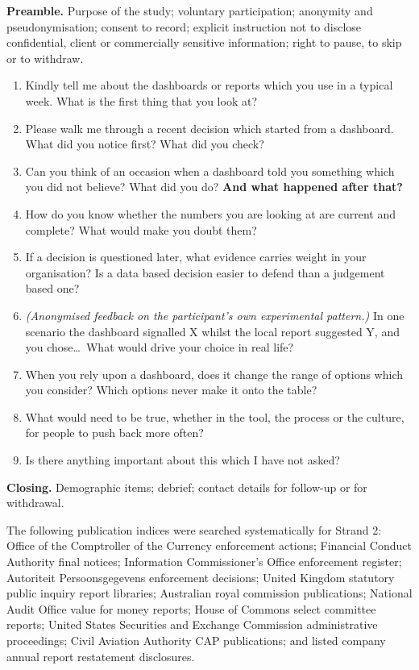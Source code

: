 \documentclass[12pt,a4paper]{article}
\begin{document}
\vspace{10pt}

\textbf{Preamble.} Purpose of the study; voluntary participation; anonymity and pseudonymisation; consent
to record; explicit instruction not to disclose confidential, client or commercially sensitive information;
right to pause, to skip or to withdraw.

\begin{enumerate}[leftmargin=*,itemsep=3pt,topsep=4pt]
\item Kindly tell me about the dashboards or reports which you use in a typical week. What is the first
thing that you look at?
\item Please walk me through a recent decision which started from a dashboard. What did you notice first?
What did you check?
\item Can you think of an occasion when a dashboard told you something which you did not believe? What did
you do? \textbf{And what happened after that?}
\item How do you know whether the numbers you are looking at are current and complete? What would make you
doubt them?
\item If a decision is questioned later, what evidence carries weight in your organisation? Is a data based
decision easier to defend than a judgement based one?
\item \emph{(Anonymised feedback on the participant's own experimental pattern.)} In one scenario the
dashboard signalled X whilst the local report suggested Y, and you chose\ldots\ What would drive your
choice in real life?
\item When you rely upon a dashboard, does it change the range of options which you consider? Which options
never make it onto the table?
\item What would need to be true, whether in the tool, the process or the culture, for people to push back
more often?
\item Is there anything important about this which I have not asked?
\end{enumerate}

\textbf{Closing.} Demographic items; debrief; contact details for follow-up or for withdrawal.

\vspace{10pt}

The following publication indices were searched systematically for Strand 2: Office of the Comptroller of
the Currency enforcement actions; Financial Conduct Authority final notices; Information Commissioner's
Office enforcement register; Autoriteit Persoonsgegevens enforcement decisions; United Kingdom statutory
public inquiry report libraries; Australian royal commission publications; National Audit Office value for
money reports; House of Commons select committee reports; United States Securities and Exchange Commission
administrative proceedings; Civil Aviation Authority CAP publications; and listed company annual report
restatement disclosures.
\end{document}
